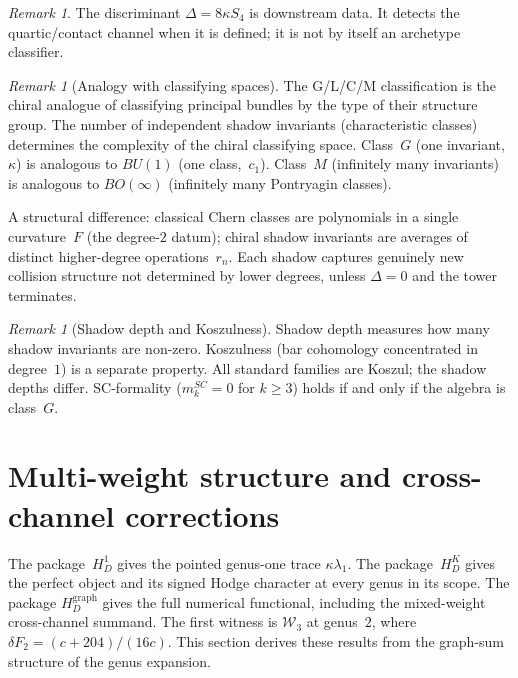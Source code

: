 \documentclass[11pt,reqno]{amsart}
\theoremstyle{definition}
\theoremstyle{remark}
\newtheorem{remark}[theorem]{Remark}
\newcommand{\cW}{\mathcal{W}}
\numberwithin{equation}{section}
\begin{document}
\begin{remark}
The discriminant $\Delta=8\kappa S_4$ is downstream data. It detects
the quartic/contact channel when it is defined; it is not by itself an
archetype classifier.
\end{remark}

\begin{remark}[Analogy with classifying spaces]
\label{rem:shadow-bg}
The G/L/C/M classification is the chiral analogue of
classifying principal bundles by the type of their structure
group. The number of independent shadow invariants
(characteristic classes) determines the complexity of the
chiral classifying space. Class~$G$
(one invariant,~$\kappa$) is analogous to $BU(1)$ (one
class,~$c_1$). Class~$M$ (infinitely many invariants) is
analogous to $BO(\infty)$ (infinitely many Pontryagin classes).

A structural difference: classical Chern classes are
polynomials in a single curvature~$F$ (the degree-$2$
datum); chiral shadow invariants are averages of distinct
higher-degree operations~$r_n$. Each shadow captures
genuinely new collision structure not determined by lower
degrees, unless $\Delta = 0$ and the tower terminates.
\end{remark}

\begin{remark}[Shadow depth and Koszulness]
\label{rem:depth-koszul}
Shadow depth measures how many shadow invariants are
non-zero. Koszulness (bar cohomology concentrated in
degree~$1$) is a separate property. All standard families are
Koszul; the shadow depths differ. SC-formality
($m_k^{SC} = 0$ for $k \ge 3$) holds if and only if the
algebra is class~$G$.
\end{remark}


\section{Multi-weight structure and cross-channel
corrections}\label{sec:multi-weight}

The package~$H_D^1$ gives the pointed genus-one trace
$\kappa\lambda_1$.  The package~$H_D^K$ gives the perfect object and
its signed Hodge character at every genus in its scope.  The package
$H_D^{\mathrm{graph}}$ gives the full numerical functional, including
the mixed-weight cross-channel summand.  The first witness is $\cW_3$
at genus~$2$,
where $\delta F_2 = (c{+}204)/(16c)$. This section derives
these results from the graph-sum structure of the genus
expansion.
\end{document}
